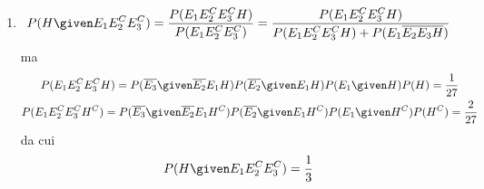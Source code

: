 \documentclass{subfiles}
\begin{document}
\begin{Exercise*}
\begin{Solution*}
\begin{enumerate}
            \item \[
                      P(H \given E_{1} E_{2}^{C}E_{3}^{C}) = \frac{P(E_{1}E_{2}^{C}E_{3}^{C}H)}{P(E_{1}E_{2}^{C}E_{3}^{C})} = \frac{P(E_{1}E_{2}^{C}E_{3}^{C}H)}{P(E_{1}E_{2}^{C}E_{3}^{C}H) + P(E_{1}\overline{E_{2}E_{3}H})}
                  \]
                  ma
                  \[\begin{gathered}
                          P(E_{1}E_{2}^{C}E_{3}^{C}H) = P(\overline{E_{3}} \given \overline{E_{2}}E_{1}H)P(\overline{E_{2}} \given E_{1}H)P(E_{1} \given H)P(H) = \frac{1}{27} \\
                          P(E_{1}E_{2}^{C}E_{3}^{C}H^{C}) = P(\overline{E_{3}} \given \overline{E_{2}}E_{1}H^{C})P(\overline{E_{2}} \given E_{1}H^{C})P(E_{1} \given H^{C})P(H^{C}) = \frac{2}{27} \\
                      \end{gathered}\]
                  da cui
                  \[
                      P(H \given E_{1} E_{2}^{C}E_{3}^{C}) = \frac{1}{3}
                  \]
        \end{enumerate}
    \end{Solution*}
\end{Exercise*}
\end{document}
